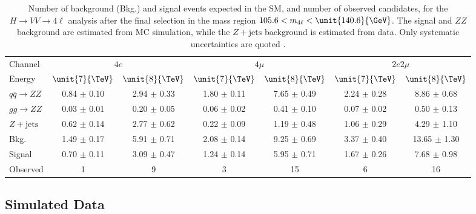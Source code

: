 \begin{table}
\centering
\caption[Number of background (Bkg.) and signal events expected in the SM, and number of
observed candidates, for the $H \to VV \to 4\ell$ analysis after the final selection in the
mass region $105.6 < m_{4\ell} < \unit{140.6}{\GeV}$. The signal and $ZZ$
background are estimated from MC simulation, while the $Z + \text{jets}$ background
is estimated from data. Only systematic uncertainties are quoted.]{
Number of background (Bkg.) and signal events expected in the SM, and number of
observed candidates, for the $H \to VV \to 4\ell$ analysis after the final selection in the
mass region $105.6 < m_{4\ell} < \unit{140.6}{\GeV}$. The signal and $ZZ$
background are estimated from MC simulation, while the $Z + \text{jets}$ background
is estimated from data. Only systematic uncertainties are quoted \cite{Khachatryan:2014kca}.
\label{tab:EventYieldsLowMass_spin}}
\begin{tabular}{lcccccc}
Channel & \multicolumn{2}{c}{$4e$} &  \multicolumn{2}{c}{$4\mu$} &  \multicolumn{2}{c}{$2e2\mu$} \\
Energy & $\unit{7}{\TeV}$ & $\unit{8}{\TeV}$ & $\unit{7}{\TeV}$ & $\unit{8}{\TeV}$ & $\unit{7}{\TeV}$ & $\unit{8}{\TeV}$  \\
\hline \hline
$q\bar{q} \to ZZ$ &  0.84  $\pm$  0.10  &  2.94 $\pm$  0.33  &  1.80  $\pm$  0.11  & 7.65  $\pm$  0.49  &  2.24  $\pm$  0.28 & 8.86  $\pm$  0.68  \\
$gg \to ZZ$ &  0.03  $\pm$  0.01 &  0.20  $\pm$  0.05    &  0.06  $\pm$  0.02 &  0.41  $\pm$  0.10    &  0.07  $\pm$  0.02   &  0.50  $\pm$  0.13 \\
$Z + \text{jets}$ & 0.62 $\pm$ 0.14 & 2.77 $\pm$ 0.62 & 0.22 $\pm$ 0.09 & 1.19 $\pm$ 0.48 & 1.06 $\pm$ 0.29 & 4.29 $\pm$ 1.10\\
\hline \hline
Bkg. & 1.49 $\pm$ 0.17 & 5.91 $\pm$ 0.71  & 2.08 $\pm$ 0.14  & 9.25 $\pm$ 0.69 &  3.37 $\pm$ 0.40 & 13.65 $\pm$ 1.30 \\
Signal &  0.70  $\pm$  0.11  &  3.09 $\pm$  0.47  &  1.24  $\pm$  0.14 &  5.95  $\pm$  0.71  & 1.67  $\pm$  0.26  &  7.68  $\pm$  0.98 \\
\hline \hline
Observed & 1 & 9 & 3 & 15 & 6 & 16 \\
\end{tabular}

\end{table}



\subsection{Simulated Data}
\label{sec:spin_MC}

